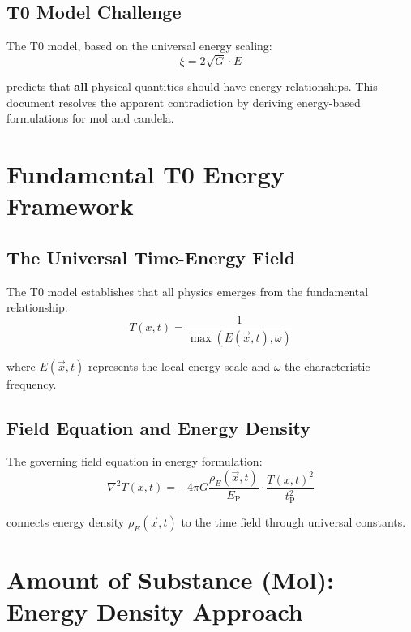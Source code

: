 \documentclass[12pt,a4paper]{article}
\newcommand{\xipar}{\xi}
\newcommand{\EP}{E_{\text{P}}}
\newcommand{\tP}{t_{\text{P}}}
\newcommand{\Tfield}{T(x,t)}
\newcommand{\rhoE}{\rho_E}
\begin{document}
	\subsection{T0 Model Challenge}
	\label{subsec:t0_challenge}
	
	The T0 model, based on the universal energy scaling:
	\begin{equation}
		\xipar = 2\sqrt{G} \cdot E
		\label{eq:t0_fundamental}
	\end{equation}
	
	predicts that \textbf{all} physical quantities should have energy relationships. This document resolves the apparent contradiction by deriving energy-based formulations for mol and candela.
	
	\section{Fundamental T0 Energy Framework}
	\label{sec:t0_framework}
	
	\subsection{The Universal Time-Energy Field}
	\label{subsec:universal_time_energy}
	
	The T0 model establishes that all physics emerges from the fundamental relationship:
	\begin{equation}
		\Tfield = \frac{1}{\max(E(\vec{x},t), \omega)}
		\label{eq:t0_time_field}
	\end{equation}
	
	where $E(\vec{x},t)$ represents the local energy scale and $\omega$ the characteristic frequency.
	
	\subsection{Field Equation and Energy Density}
	\label{subsec:field_equation}
	
	The governing field equation in energy formulation:
	\begin{equation}
		\nabla^2 \Tfield = -4\pi G \frac{\rhoE(\vec{x},t)}{\EP} \cdot \frac{\Tfield^2}{\tP^2}
		\label{eq:t0_field_equation}
	\end{equation}
	
	connects energy density $\rhoE(\vec{x},t)$ to the time field through universal constants.
	
	\section{Amount of Substance (Mol): Energy Density Approach}
	\label{sec:mol_derivation}
	
\end{document}
